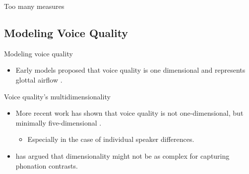 \documentclass{beamer}
\begin{document}
\begin{frame}{Too many measures}
  
\end{frame}

\subsection{Modeling Voice Quality}


\begin{frame}{Modeling voice quality}
  \begin{itemize}
    \item Early models proposed that voice quality is one dimensional and represents glottal airflow \citep{ladefogedPreliminariesLinguisticPhonetics1971,ladefogedSoundsWorldsLanguages1996}.
  \end{itemize}
  \begin{figure}[h!]
\end{figure}
\end{frame}

\begin{frame}{Voice quality's multidimensionality}
  \begin{itemize}
    \item More recent work has shown that voice quality is not one-dimensional, but minimally five-dimensional \citep[e.g.,][]{garellekModelingVoiceSource2016,kreimanValidatingPsychoacousticModel2021}.
    \begin{itemize}
      \item Especially in the case of individual speaker differences.
    \end{itemize}
    \item \citet{garellekVoiceQualityTone2013} has argued that dimensionality might not be as complex for capturing phonation contrasts.
  \end{itemize}
\end{frame}
\end{document}
